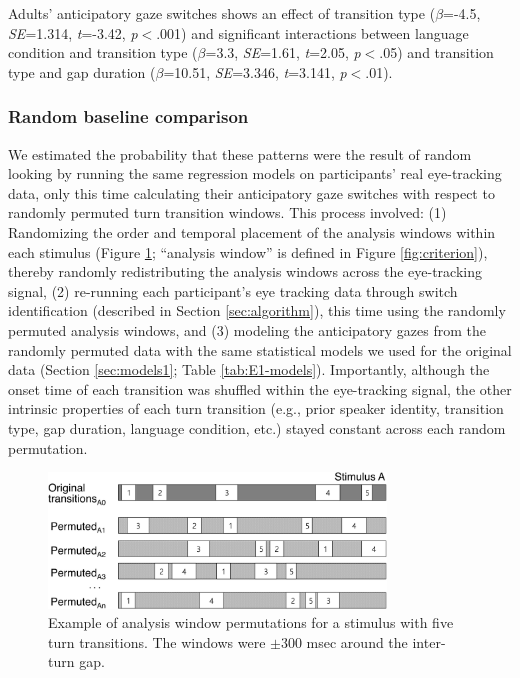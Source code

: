 \documentclass[authoryear, 12pt]{elsarticle}
\begin{document}
Adults' anticipatory gaze switches shows an effect of transition type (\textit{$\beta$}=-4.5, \textit{SE}=1.314, \textit{t}=-3.42, \textit{p}$<$.001) and significant interactions between language condition and transition type (\textit{$\beta$}=3.3, \textit{SE}=1.61, \textit{t}=2.05, \textit{p}$<$.05) and transition type and gap duration (\textit{$\beta$}=10.51, \textit{SE}=3.346, \textit{t}=3.141, \textit{p}$<$.01).

\subsubsection{Random baseline comparison}
\label{sec:randbaseline1}

We estimated the probability that these patterns were the result of random looking by running the same regression models on participants' real eye-tracking data, only this time calculating their anticipatory gaze switches with respect to randomly permuted turn transition windows. This process involved: (1) Randomizing the order and temporal placement of the analysis windows within each stimulus (Figure \ref{fig:shuffling}; ``analysis window'' is defined in Figure \ref{fig:criterion}), thereby randomly redistributing the analysis windows across the eye-tracking signal, (2) re-running each participant's eye tracking data through switch identification (described in Section \ref{sec:algorithm}), this time using the randomly permuted analysis windows, and (3) modeling the anticipatory gazes from the randomly permuted data with the same statistical models we used for the original data (Section \ref{sec:models1}; Table \ref{tab:E1-models}). Importantly, although the onset time of each transition was shuffled within the eye-tracking signal, the other intrinsic properties of each turn transition (e.g., prior speaker identity, transition type, gap duration, language condition, etc.) stayed constant across each random permutation. 

\begin{figure}[t!]
\begin{center}
\includegraphics[width=0.8\textwidth]{figures/FIG-ShuffledWindows.png}
\end{center}
\caption{Example of analysis window permutations for a stimulus with five turn transitions. The windows were $\pm$300 msec around the inter-turn gap.} 
\label{fig:shuffling}
\end{figure}
\end{document}
